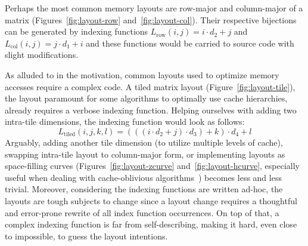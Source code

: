 Perhaps the most common memory layouts are row-major and column-major of a matrix (Figures~\ref{fig:layout-row} and~\ref{fig:layout-col}). Their respective bijections can be generated by indexing functions $L_{\text{row}}(i,j) = i \cdot d_2 + j$ and $L_{\text{col}}(i,j) = j \cdot d_1 + i$ and these functions would be carried to source code with slight modifications.

As alluded to in the motivation, common layouts used to optimize memory accesses require a complex code. A tiled matrix layout (Figure~\ref{fig:layout-tile}), the layout paramount for some algorithms to optimally use cache hierarchies, already requires a verbose indexing function. Helping ourselves with adding two intra-tile dimensions, the indexing function would look as follows:
$$L_{\text{tiled}}(i,j,k,l) = (((i \cdot d_2 + j) \cdot d_3) + k) \cdot d_4 + l$$
Arguably, adding another tile dimension (to utilize multiple levels of cache), swapping intra-tile layout to column-major form, or implementing layouts as space-filling curves (Figures~\ref{fig:layout-zcurve} and~\ref{fig:layout-hcurve}, especially useful when dealing with cache-oblivious algorithms~\cite{bader2006cache}) becomes less and less trivial. Moreover, considering the indexing functions are written ad-hoc, the layouts are tough subjects to change since a layout change requires a thoughtful and error-prone rewrite of all index function occurrences. On top of that, a complex indexing function is far from self-describing, making it hard, even close to impossible, to guess the layout intentions.

